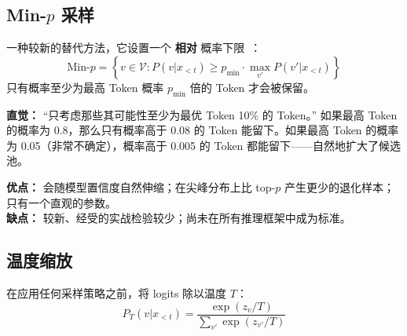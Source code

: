 \subsection{\texorpdfstring{Min-$p$ 采样}{Min-p Sampling}}
\label{min-p-sampling}

一种较新的替代方法，它设置一个 \textbf{相对} 概率下限~\cite{nguyen2024minp}：
\[
\text{Min-}p = \left\{ v \in \mathcal{V} : P(v | x_{<t}) \geq p_{\min} \cdot \max_{v'} P(v' | x_{<t}) \right\}
\]
只有概率至少为最高 Token 概率 $p_{\min}$ 倍的 Token 才会被保留。

\textbf{直觉：} “只考虑那些其可能性至少为最优 Token 10\% 的 Token。” 如果最高 Token 的概率为 0.8，那么只有概率高于 0.08 的 Token 能留下。如果最高 Token 的概率为 0.05（非常不确定），概率高于 0.005 的 Token 都能留下——自然地扩大了候选池。

\textbf{优点：} 会随模型置信度自然伸缩；在尖峰分布上比 top-$p$ 产生更少的退化样本；只有一个直观的参数。\\

\textbf{缺点：} 较新、经受的实战检验较少；尚未在所有推理框架中成为标准。

\subsection{温度缩放}
\label{temperature-scaling}

在应用任何采样策略之前，将 logits 除以温度 $T$：
\[
P_T(v | x_{<t}) = \frac{\exp(z_v / T)}{\sum_{v'} \exp(z_{v'} / T)}
\]

